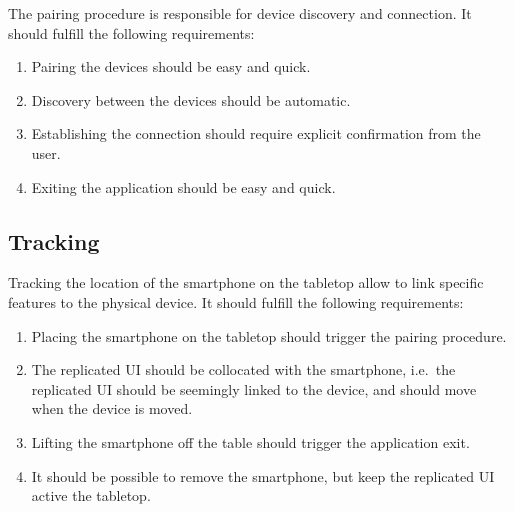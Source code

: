 The pairing procedure is responsible for device discovery and connection.
It should fulfill the following requirements:

\label{RA}
\begin{enumerate}[{RA}-1]
\item Pairing the devices should be easy and quick.
\item Discovery between the devices should be automatic.
\item Establishing the connection should require explicit confirmation from the user.
\item Exiting the application should be easy and quick.
\end{enumerate}


\subsection{Tracking}

Tracking the location of the smartphone on the tabletop allow to link specific features to the physical device.
It should fulfill the following requirements:

\label{RB}
\begin{enumerate}[{RB}-1]
\item Placing the smartphone on the tabletop should trigger the pairing procedure.
\item The replicated UI should be collocated with the smartphone, i.e.\ the replicated UI should be seemingly linked to the device, and should move when the device is moved.
\item Lifting the smartphone off the table should trigger the application exit.
\item It should be possible to remove the smartphone, but keep the replicated UI active the tabletop.
\end{enumerate}

